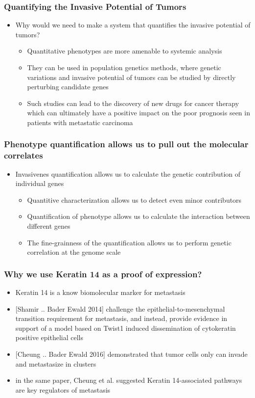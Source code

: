 \documentclass{beamer} %
\begin{document}
\begin{frame}
	\frametitle{Quantifying the Invasive Potential of Tumors}
	\begin{itemize}
		\item Why would we need to make a system that quantifies the invasive potential of tumors?
		\begin{itemize}
				\item Quantitative phenotypes are more amenable to systemic analysis
				\item They can be used in population genetics methods, where genetic variations and invasive potential of tumors can be studied by directly perturbing candidate genes
				\item Such studies can lead to the discovery of new drugs for cancer therapy which can ultimately have a positive impact on the poor prognosis seen in patients with metastatic carcinoma 		\end{itemize}
	\end{itemize}
\end{frame}


\begin{frame}
	\frametitle{Phenotype quantification allows us to pull out the molecular correlates}
	\begin{itemize}
		\item Invasivenes quantification allows us to calculate the genetic contribution of individual genes
		\begin{itemize}
				\item Quantitive characterization allows us to detect even minor contributors
				\item Quantification of phenotype allows us to calculate the interaction between different genes
				\item The fine-grainness of the quantification allows us to perform genetic correlation at the genome scale
		\end{itemize}
	\end{itemize}
\end{frame}


\begin{frame}
	\frametitle{Why we use Keratin 14 as a proof of expression?}
	\begin{itemize}
			\item Keratin 14 is a know biomolecular marker for metastasis
			\item {[Shamir .. Bader Ewald 2014]} challenge the epithelial-to-mesenchymal transition requirement for metastasis, and instead, provide evidence in support of a model based on Twist1 induced dissemination of cytokeratin positive epithelial cells
			\item {[Cheung .. Bader Ewald 2016]} demonstrated that tumor cells only can invade and metastasize in clusters
			\item in the same paper, Cheung et al. suggested Keratin 14-associated pathways are key regulators of metastasis
	\end{itemize}
\end{frame}
\end{document}
